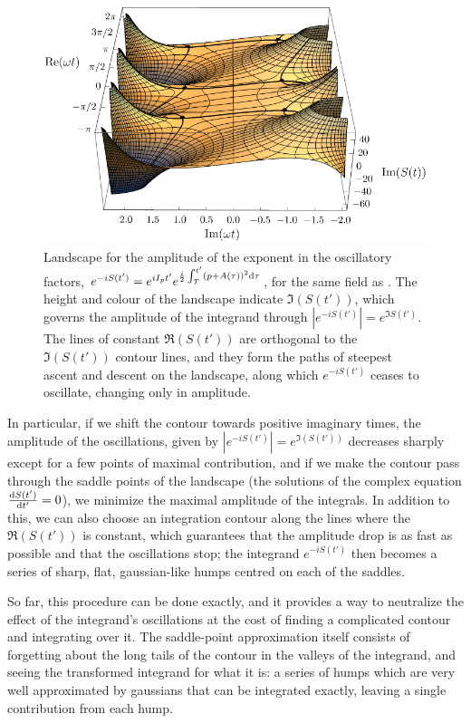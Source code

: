\begin{figure}[t!]
  \centering
  \includegraphics[scale=1]{2-ARM-theory/Figures/figure2B.pdf}
  \caption[Landscape of the imaginary action $\Im(S(t))$ over imaginary time, showing the steepest-descent contours]{%
    Landscape for the amplitude of the exponent in the oscillatory factors, $e^{-iS(t')}=e^{i I_p t'} e^{\frac{i}{2} \int_T^{t'} \left(p+ A(\tau) \right)^2\mathrm{d}\tau}$, for the same field as . The height and colour of the landscape indicate $\Im(S(t'))$, which governs the amplitude of the integrand through $|e^{-iS(t')}|=e^{\Im{S(t')}}$. The lines of constant $\Re(S(t'))$ are orthogonal to the $\Im(S(t'))$ contour lines, and they form the paths of steepest ascent and descent on the landscape, along which $e^{-iS(t')}$ ceases to oscillate, changing only in amplitude.
  }
  \label{f2-saddle-points-3d}
\end{figure}


In particular, if we shift the contour towards positive imaginary times, the amplitude of the oscillations, given by $|e^{-iS(t')}|=e^{\Im\left(S(t')\right)}$ decreases sharply except for a few points of maximal contribution, and if we make the contour pass through the saddle points of the landscape (the solutions of the complex equation $\frac{\mathrm{d} S(t')}{\mathrm{d} t'}=0$), we minimize the maximal amplitude of the integrals. In addition to this, we can also choose an integration contour along the lines where the $\Re(S(t'))$ is constant, which guarantees that the amplitude drop is as fast as possible and that the oscillations stop; the integrand $e^{-iS(t')}$ then becomes a series of sharp, flat, gaussian-like humps centred on each of the saddles. 

So far, this procedure can be done exactly, and it provides a way to neutralize the effect of the integrand's oscillations at the cost of finding a complicated contour and integrating over it. The saddle-point approximation itself consists of forgetting about the long tails of the contour in the valleys of the integrand, and seeing the transformed integrand for what it is: a series of humps which are very well approximated by gaussians that can be integrated exactly, leaving a single contribution from each hump.


